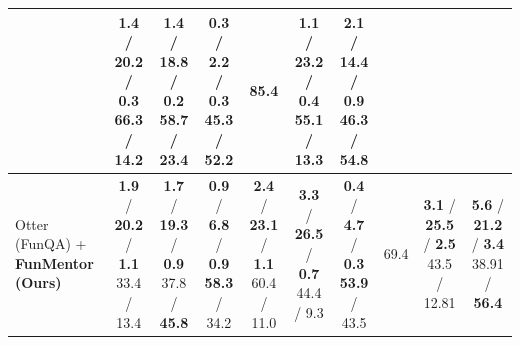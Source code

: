 \begin{table}[h]
{{\begin{tabular}{l|ccc|cccc|cc}
& \makecell[c]{1.4 / 20.2 / 0.3 \\ \textbf{66.3} / \textbf{14.2}}
& \makecell[c]{1.4 / 18.8 / 0.2 \\ \textbf{58.7} / \textbf{23.4}}
& \makecell[c]{0.3 / 2.2 / \textbf{0.3} \\ 45.3 / \textbf{52.2}}
& \textbf{85.4}

& \makecell[c]{1.1 / 23.2 / 0.4 \\ \textbf{55.1} / \textbf{13.3}}
& \makecell[c]{2.1 / 14.4 / 0.9 \\ \textbf{46.3} / 54.8} \\
\toprule
Otter (FunQA) \cite{li2023otter} + \textbf{FunMentor (Ours)}
& \makecell[c]{\textbf{1.9} / \textbf{20.2} / \textbf{1.1} \\ 33.4 / 13.4}
& \makecell[c]{\textbf{1.7} / \textbf{19.3} / \textbf{0.9} \\ 37.8 / \textbf{45.8}}
& \makecell[c]{\textbf{0.9} / \textbf{6.8} / \textbf{0.9} \\ \textbf{58.3} / 34.2}

& \makecell[c]{\textbf{2.4} / \textbf{23.1} / \textbf{1.1} \\ 60.4 / 11.0}
& \makecell[c]{\textbf{3.3} / \textbf{26.5} / \textbf{0.7} \\ 44.4 / 9.3}
& \makecell[c]{\textbf{0.4} / \textbf{4.7} / \textbf{0.3} \\ \textbf{53.9} / 43.5}
& 69.4
 
& \makecell[c]{\textbf{3.1} / \textbf{25.5} / \textbf{2.5} \\ 43.5 / 12.81}
& \makecell[c]{\textbf{5.6} / \textbf{21.2} / \textbf{3.4} \\ 38.91 / \textbf{56.4}}\\



\bottomrule

\end{tabular}}\par
}
\vspace{-0.5cm}
\end{table}